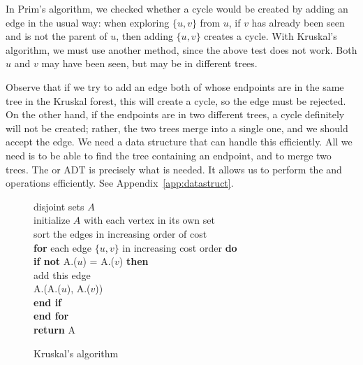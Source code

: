 In Prim's algorithm, we checked whether a cycle would be created by
adding an edge in the usual way: when exploring $\{u, v\}$ from $u$, if $v$ has already been seen and is not the parent of $u$, then adding $\{u, v\}$ creates a cycle. With Kruskal's algorithm, we must use another method, since the above test does not work. Both $u$ and $v$ may have been seen, but may be in different trees. 

Observe that if we try to add an edge both of whose
endpoints are in the same tree in the Kruskal forest, this will create a
cycle, so the edge must be rejected. On the other hand, if the
endpoints are in two different trees, a cycle
definitely will not be created; rather, the two trees merge into a
single one, and we should accept the edge. We need a data structure
that can handle this efficiently. All we need is to be able to find
the tree containing an endpoint, and to merge two trees. The  or  ADT is precisely what is needed. It allows us to perform the  and  operations efficiently. See Appendix~\ref{app:datastruct}.

\begin{figure}
\label{fig:Kruskal-alg}

{
disjoint sets $A$ \\

initialize $A$ with each vertex in its own set \\

sort the edges in increasing order of cost \\

\textbf{for} each edge $\{u, v\}$ in increasing cost order \textbf{do}\\

\> \textbf{if not } A.($u$) = A.($v$) \textbf{then} \\

\> \>  add this edge \\

\> \> A.(A.($u$), A.($v$)) \\

\> \textbf{end if} \\

\textbf{end for} \\

\textbf{return} A \\
}

\caption{Kruskal's algorithm}
\end{figure}


